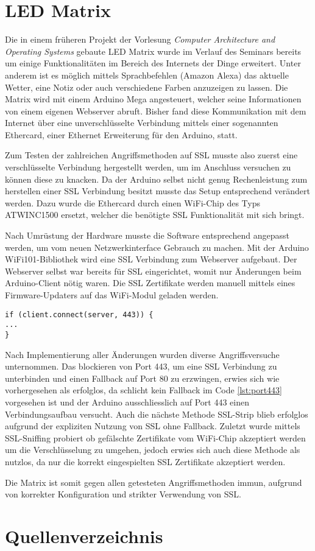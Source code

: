 \documentclass[11pt,a4paper]{scrartcl}
\begin{document}
\section{LED Matrix}
Die in einem früheren Projekt der Vorlesung \textit{Computer Architecture and Operating Systems} gebaute LED Matrix wurde im Verlauf des Seminars bereits um einige Funktionalitäten im Bereich des Internets der Dinge erweitert. Unter anderem ist es möglich mittels Sprachbefehlen (Amazon Alexa) das aktuelle Wetter, eine Notiz oder auch verschiedene Farben anzuzeigen zu lassen. Die Matrix wird mit einem Arduino Mega angesteuert, welcher seine Informationen von einem eigenen Webserver abruft. Bisher fand diese Kommunikation mit dem Internet über eine unverschlüsselte Verbindung mittels einer sogenannten Ethercard, einer Ethernet Erweiterung für den Arduino, statt.

Zum Testen der zahlreichen Angriffsmethoden auf SSL musste also zuerst eine verschlüsselte Verbindung hergestellt werden, um im Anschluss versuchen zu können diese zu knacken. Da der Arduino selbst nicht genug Rechenleistung zum herstellen einer SSL Verbindung besitzt musste das Setup entsprechend verändert werden. Dazu wurde die Ethercard durch einen WiFi-Chip des Typs ATWINC1500 ersetzt, welcher die benötigte SSL Funktionalität mit sich bringt. 

Nach Umrüstung der Hardware musste die Software entsprechend angepasst werden, um vom neuen Netzwerkinterface Gebrauch zu machen. Mit der Arduino WiFi101-Bibliothek \cite{arduino:WiFi} wird eine SSL Verbindung zum Webserver aufgebaut. Der Webserver selbst war bereits für SSL eingerichtet, womit nur Änderungen beim Arduino-Client nötig waren. Die SSL Zertifikate werden manuell mittels eines Firmware-Updaters auf das WiFi-Modul geladen werden.
\begin{lstlisting}[label={lst:port443},caption={Port 443 ohne Fallback auf Port 80}]
if (client.connect(server, 443)) {
...
}
\end{lstlisting}
Nach Implementierung aller Änderungen wurden diverse Angriffsversuche unternommen. Das blockieren von Port 443, um eine SSL Verbindung zu unterbinden und einen Fallback auf Port 80 zu erzwingen, erwies sich wie vorhergesehen als erfolglos, da schlicht kein Fallback im Code \ref{lst:port443} vorgesehen ist und der Arduino ausschliesslich auf Port 443 einen Verbindungsaufbau versucht.
Auch die nächste Methode SSL-Strip blieb erfolglos aufgrund der expliziten Nutzung von SSL ohne Fallback.
Zuletzt wurde mittels SSL-Sniffing probiert ob gefälschte Zertifikate vom WiFi-Chip akzeptiert werden um die Verschlüsselung zu umgehen, jedoch erwies sich auch diese Methode als nutzlos, da nur die korrekt eingespielten SSL Zertifikate akzeptiert werden. 

Die Matrix ist somit gegen allen getesteten Angriffsmethoden immun, aufgrund von korrekter Konfiguration und strikter Verwendung von SSL. 
\section{Quellenverzeichnis}
\printbibliography[heading=none]
\end{document}
